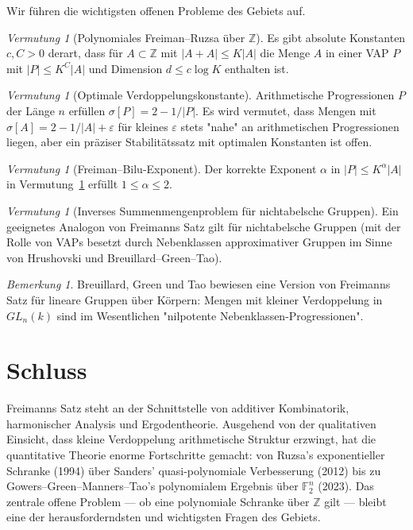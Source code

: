 \documentclass[12pt,a4paper]{amsart}
\theoremstyle{definition}
\theoremstyle{remark}
\newtheorem{vermutung}[theorem]{Vermutung}
\newtheorem{bemerkung}[theorem]{Bemerkung}
\newcommand{\F}{\mathbb{F}}
\newcommand{\Z}{\mathbb{Z}}
\begin{document}
Wir führen die wichtigsten offenen Probleme des Gebiets auf.

\begin{vermutung}[Polynomiales Freiman--Ruzsa über $\Z$]\label{verm:pfr_z}
Es gibt absolute Konstanten $c, C > 0$ derart, dass für $A \subset \Z$ mit
$|A+A| \leq K|A|$ die Menge $A$ in einer VAP $P$ mit $|P| \leq K^C |A|$ und
Dimension $d \leq c \log K$ enthalten ist.
\end{vermutung}

\begin{vermutung}[Optimale Verdoppelungskonstante]\label{verm:opt_verd}
Arithmetische Progressionen $P$ der Länge $n$ erfüllen $\sigma[P] = 2 - 1/|P|$.
Es wird vermutet, dass Mengen mit $\sigma[A] = 2 - 1/|A| + \varepsilon$ für kleines
$\varepsilon$ stets "nahe" an arithmetischen Progressionen liegen, aber ein
präziser Stabilitätssatz mit optimalen Konstanten ist offen.
\end{vermutung}

\begin{vermutung}[Freiman--Bilu-Exponent]\label{verm:fb_exp}
Der korrekte Exponent $\alpha$ in $|P| \leq K^\alpha |A|$ in
Vermutung~\ref{verm:pfr_z} erfüllt $1 \leq \alpha \leq 2$.
\end{vermutung}

\begin{vermutung}[Inverses Summenmengenproblem für nichtabelsche Gruppen]
\label{verm:nichtabelsch}
Ein geeignetes Analogon von Freimanns Satz gilt für nichtabelsche Gruppen
(mit der Rolle von VAPs besetzt durch Nebenklassen approximativer Gruppen im
Sinne von Hrushovski und Breuillard--Green--Tao).
\end{vermutung}

\begin{bemerkung}
Breuillard, Green und Tao \cite{BreuillardGreenTao2012} bewiesen eine Version von
Freimanns Satz für lineare Gruppen über Körpern: Mengen mit kleiner Verdoppelung
in $GL_n(k)$ sind im Wesentlichen "nilpotente Nebenklassen-Progressionen".
\end{bemerkung}

\section{Schluss}

Freimanns Satz steht an der Schnittstelle von additiver Kombinatorik, harmonischer
Analysis und Ergodentheorie. Ausgehend von der qualitativen Einsicht, dass kleine
Verdoppelung arithmetische Struktur erzwingt, hat die quantitative Theorie enorme
Fortschritte gemacht: von Ruzsa's exponentieller Schranke (1994) über Sanders'
quasi-polynomiale Verbesserung (2012) bis zu Gowers--Green--Manners--Tao's
polynomialem Ergebnis über $\F_2^n$ (2023). Das zentrale offene Problem —
ob eine polynomiale Schranke über $\Z$ gilt — bleibt eine der herausforderndsten
und wichtigsten Fragen des Gebiets.
\end{document}
